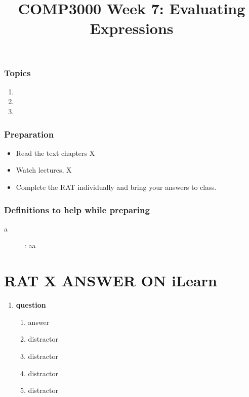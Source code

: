 \documentclass[twoside=false, DIV=14]{scrartcl}
\title{\color{redish} \vspace{-1em}COMP3000 Week 7: Evaluating Expressions}
\begin{document}
{\color{blackish}\maketitle}\vspace{-7em}

\begin{abstract}
\end{abstract}

\section*{Topics}
\begin{enumerate}
\item
\item
\item
\end{enumerate}

\section*{Preparation}
\begin{itemize}
\item Read the text chapters X
\item Watch lectures, X
\item Complete the RAT individually and bring your answers to class.
\end{itemize}

\section*{Definitions to help while preparing}
\begin{description}
\item[a]: aa
\end{description}

\newpage
\part*{RAT X \hspace{6em} {\small ANSWER ON iLearn}}
\renewcommand{\labelenumii}{\alph{enumii}) $\square$}
\begin{enumerate}
\item \textbf{question}
\begin{enumerate}
  \item answer \tick
  \item distractor
  \item distractor
  \item distractor
  \item distractor
\end{enumerate}

\end{enumerate}
\end{document}
